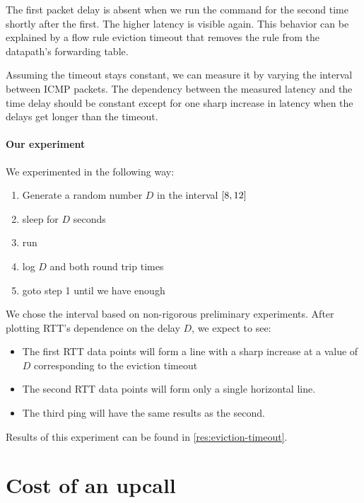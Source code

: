 The first packet delay is absent when we run the  command for the second time shortly after the first. The higher latency is visible again. This behavior can be explained by a flow rule eviction timeout that removes the rule from the datapath's forwarding table.

Assuming the timeout stays constant, we can measure it by varying the interval between ICMP packets. The dependency between the measured latency and the time delay should be constant except for one sharp increase in latency when the delays get longer than the timeout.

\paragraph{Our experiment}
We experimented in the following way:

\begin{enumerate}
    \item Generate a random number $D$ in the interval $\interval{8}{12}$
    \item sleep for $D$ seconds
    \item run 
    \item log $D$ and both round trip times
    \item goto step 1 until we have enough
\end{enumerate}

We chose the interval based on non-rigorous preliminary experiments. After plotting RTT's dependence on the delay $D$, we expect to see:

\begin{itemize}
    \item The first RTT data points will form a line with a sharp increase at a value of $D$ corresponding to the eviction timeout

    \item The second RTT data points will form only a single horizontal line.

    \item The third ping will have the same results as the second.
\end{itemize}

Results of this experiment can be found in \cref{res:eviction-timeout}.

\section{Cost of an upcall}
\label{design:upcall-cost}

